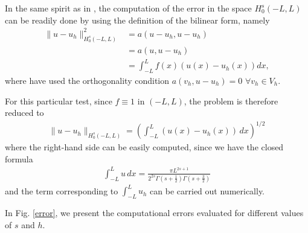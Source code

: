 

In the same spirit as in \cite{acosta2017short}, the computation of the error in the space $H_0^s(-L,L)$ can be readily done by using the definition of the bilinear form, namely
%
\begin{align*}
\|u-u_h\|^2_{H_0^s(-L,L)}&=a(u-u_h,u-u_h) \\
&=a(u,u-u_h) \\
&=\int_{-L}^{L}f(x)\left(u(x)-u_h(x)\right)dx,
\end{align*}
%
where have used the orthogonality condition $a(v_h,u-u_h)=0$ $\forall v_h \in V_h$.

For this particular test, since $f\equiv 1$ in $(-L,L)$, the problem is therefore reduced to
%
\begin{align*}
\|u-u_h\|_{H^s_0(-L,L)}=\left(\int_{-L}^{L}\left( u(x)-u_h(x) \right)\,dx\right)^{1/2}
\end{align*}
%
where the right-hand side can be easily computed, since we have the closed formula 
%
\begin{align*}
\int_{-L}^{L}u\,dx= \frac{\pi L^{2s+1}}{2^{2s}\Gamma(s+\frac{1}{2})\Gamma(s+\frac{3}{2})}
\end{align*}
% 
and the term corresponding to $\int_{-L}^{L}u_h$ can be carried out numerically. 

In Fig.  \ref{error}, we present the computational errors evaluated for different values of $s$ and $h$. 

